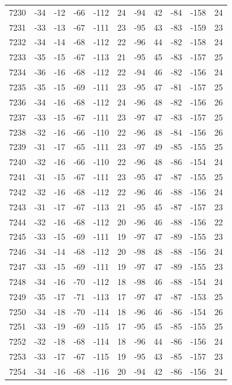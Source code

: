 \begin{table}[H]
\begin{tabular}{lllllllllll}
7230 & -34 & -12 & -66 & -112 & 24 & -94 & 42 & -84 & -158 & 24 \\
7231 & -33 & -13 & -67 & -111 & 23 & -95 & 43 & -83 & -159 & 23 \\
7232 & -34 & -14 & -68 & -112 & 22 & -96 & 44 & -82 & -158 & 24 \\
7233 & -35 & -15 & -67 & -113 & 21 & -95 & 45 & -83 & -157 & 25 \\
7234 & -36 & -16 & -68 & -112 & 22 & -94 & 46 & -82 & -156 & 24 \\
7235 & -35 & -15 & -69 & -111 & 23 & -95 & 47 & -81 & -157 & 25 \\
7236 & -34 & -16 & -68 & -112 & 24 & -96 & 48 & -82 & -156 & 26 \\
7237 & -33 & -15 & -67 & -111 & 23 & -97 & 47 & -83 & -157 & 25 \\
7238 & -32 & -16 & -66 & -110 & 22 & -96 & 48 & -84 & -156 & 26 \\
7239 & -31 & -17 & -65 & -111 & 23 & -97 & 49 & -85 & -155 & 25 \\
7240 & -32 & -16 & -66 & -110 & 22 & -96 & 48 & -86 & -154 & 24 \\
7241 & -31 & -15 & -67 & -111 & 23 & -95 & 47 & -87 & -155 & 25 \\
7242 & -32 & -16 & -68 & -112 & 22 & -96 & 46 & -88 & -156 & 24 \\
7243 & -31 & -17 & -67 & -113 & 21 & -95 & 45 & -87 & -157 & 23 \\
7244 & -32 & -16 & -68 & -112 & 20 & -96 & 46 & -88 & -156 & 22 \\
7245 & -33 & -15 & -69 & -111 & 19 & -97 & 47 & -89 & -155 & 23 \\
7246 & -34 & -14 & -68 & -112 & 20 & -98 & 48 & -88 & -156 & 24 \\
7247 & -33 & -15 & -69 & -111 & 19 & -97 & 47 & -89 & -155 & 23 \\
7248 & -34 & -16 & -70 & -112 & 18 & -98 & 46 & -88 & -154 & 24 \\
7249 & -35 & -17 & -71 & -113 & 17 & -97 & 47 & -87 & -153 & 25 \\
7250 & -34 & -18 & -70 & -114 & 18 & -96 & 46 & -86 & -154 & 26 \\
7251 & -33 & -19 & -69 & -115 & 17 & -95 & 45 & -85 & -155 & 25 \\
7252 & -32 & -18 & -68 & -114 & 18 & -96 & 44 & -86 & -156 & 24 \\
7253 & -33 & -17 & -67 & -115 & 19 & -95 & 43 & -85 & -157 & 23 \\
7254 & -34 & -16 & -68 & -116 & 20 & -94 & 42 & -86 & -156 & 24 \\

\end{tabular}
\end{table}
